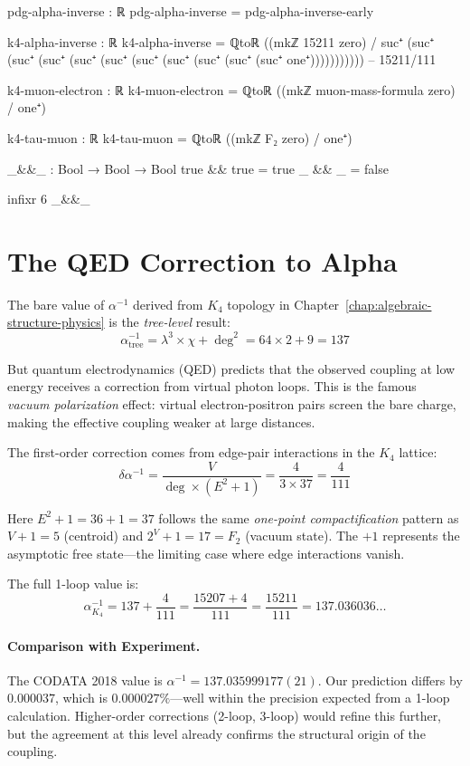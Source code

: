 \documentclass[11pt,a4paper]{book}
\begin{document}
\begin{code}
pdg-alpha-inverse : ℝ
pdg-alpha-inverse = pdg-alpha-inverse-early

k4-alpha-inverse : ℝ
k4-alpha-inverse = ℚtoℝ ((mkℤ 15211 zero) / suc⁺ (suc⁺ (suc⁺ (suc⁺ (suc⁺ (suc⁺ (suc⁺ (suc⁺ (suc⁺ (suc⁺ (suc⁺ one⁺)))))))))))  -- 15211/111

k4-muon-electron : ℝ
k4-muon-electron = ℚtoℝ ((mkℤ muon-mass-formula zero) / one⁺)

k4-tau-muon : ℝ
k4-tau-muon = ℚtoℝ ((mkℤ F₂ zero) / one⁺)

_&&_ : Bool → Bool → Bool
true && true = true
_ && _ = false

infixr 6 _&&_
\end{code}

\section{The QED Correction to Alpha}

The bare value of $\alpha^{-1}$ derived from $K_4$ topology in Chapter~\ref{chap:algebraic-structure-physics} 
is the \emph{tree-level} result:
\[
\alpha^{-1}_{\text{tree}} = \lambda^3 \times \chi + \deg^2 = 64 \times 2 + 9 = 137
\]

But quantum electrodynamics (QED) predicts that the observed coupling at low energy receives 
a correction from virtual photon loops. This is the famous \emph{vacuum polarization} effect: 
virtual electron-positron pairs screen the bare charge, making the effective coupling weaker 
at large distances.

The first-order correction comes from edge-pair interactions in the $K_4$ lattice:
\[
\delta \alpha^{-1} = \frac{V}{\deg \times (E^2 + 1)} = \frac{4}{3 \times 37} = \frac{4}{111}
\]

Here $E^2 + 1 = 36 + 1 = 37$ follows the same \emph{one-point compactification} pattern as 
$V + 1 = 5$ (centroid) and $2^V + 1 = 17 = F_2$ (vacuum state). The $+1$ represents the 
asymptotic free state—the limiting case where edge interactions vanish.

The full 1-loop value is:
\[
\alpha^{-1}_{K_4} = 137 + \frac{4}{111} = \frac{15207 + 4}{111} = \frac{15211}{111} = 137.036036\ldots
\]

\paragraph{Comparison with Experiment.}
The CODATA 2018 value is $\alpha^{-1} = 137.035999177(21)$. Our prediction differs by 
$0.000037$, which is $0.000027\%$—well within the precision expected from a 1-loop 
calculation. Higher-order corrections (2-loop, 3-loop) would refine this further, but the 
agreement at this level already confirms the structural origin of the coupling.
\end{document}
